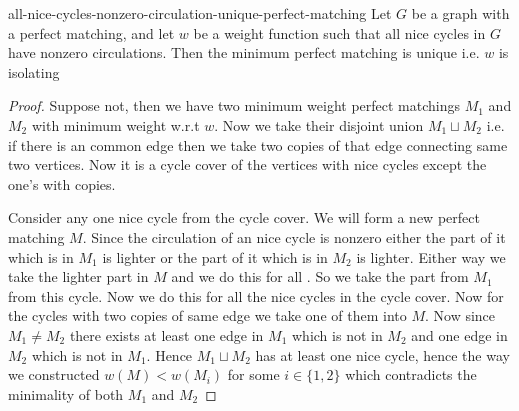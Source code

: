 \begin{Lemma}{\cite[Lemma 3.2]{DattaKulkarniRoy_2009_DIa}}{all-nice-cycles-nonzero-circulation-unique-perfect-matching}
	Let $G$ be a graph with a perfect matching, and let $w$ be a weight function such that all nice cycles in $G$ have nonzero circulations. Then the minimum perfect matching is unique i.e. $w$ is isolating
\end{Lemma}
\begin{proof}
	Suppose  not, then we have two minimum weight perfect matchings $M_1$ and $M_2$ with minimum weight w.r.t $w$. Now we take their disjoint union $M_1\sqcup M_2$ i.e. if there is an common edge then we take two copies of that edge connecting same two vertices. Now it is a cycle cover of the vertices with nice cycles except the one's with copies. 
	
	Consider any one nice cycle from the cycle cover. We will form a new perfect matching $M$. Since the circulation of an nice cycle is nonzero either the part of it which is in
	$M_1$ is lighter or the part of it which is in $M_2$ is lighter. Either way we take the lighter part in $M$ and we do this for all . So we take the part from $M_1$ from this cycle. Now we do this for all the nice cycles in the cycle cover. Now for the cycles with two copies of same edge we take one of them into $M$. Now since $M_1\neq M_2$ there exists at least one edge in $M_1$ which is not in $M_2$ and one edge in $M_2$ which is not in $M_1$. Hence $M_1\sqcup M_2$ has at least one nice cycle, hence the way we constructed $w(M)<w(M_i)$ for some $i\in \{1,2\}$ which contradicts the minimality of both $M_1$ and $M_2$
\end{proof}
